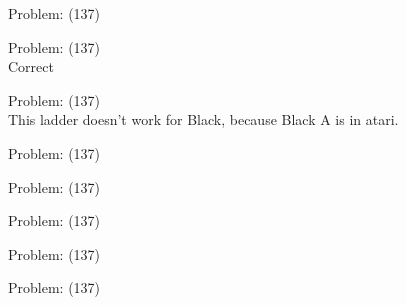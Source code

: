 \documentclass[11pt]{article}
\begin{document}
\begin{minipage}[t]{0.5\textwidth}
  {\centering
  
Problem: (137)\\
  }
\end{minipage}
\begin{minipage}[t]{0.5\textwidth}
  {\centering
  
Problem: (137)\\
Correct\\
  }
\end{minipage}
\begin{minipage}[t]{0.5\textwidth}
  {\centering
  
Problem: (137)\\
This ladder doesn't work for Black, because Black A is in atari.\\
  }
\end{minipage}
\begin{minipage}[t]{0.5\textwidth}
  {\centering
  
Problem: (137)\\
  }
\end{minipage}
\begin{minipage}[t]{0.5\textwidth}
  {\centering
  
Problem: (137)\\
  }
\end{minipage}
\begin{minipage}[t]{0.5\textwidth}
  {\centering
  
Problem: (137)\\
  }
\end{minipage}
\begin{minipage}[t]{0.5\textwidth}
  {\centering
  
Problem: (137)\\
  }
\end{minipage}
\begin{minipage}[t]{0.5\textwidth}
  {\centering
  
Problem: (137)\\
  }
\end{minipage}
\end{document}
